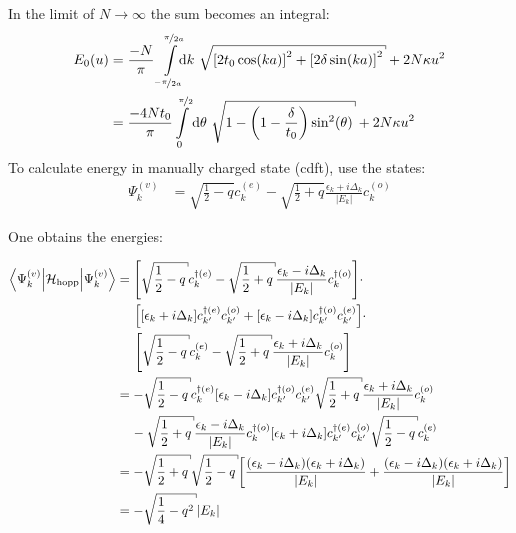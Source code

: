 In the limit of $N \rightarrow \infty$ the sum becomes an integral:
\begin{align}
	E_0(u) &= \frac{-N}{\pi}\int\limits_{\nicefrac{-\pi}{2a}}^{\nicefrac{\pi}{2a}}\hspace*{-0.2cm}\text{d}k\ \sqrt{\left[2t_0\cos(ka)\right]^2+\left[2\delta\sin(ka)\right]^2} + 2N\kappa u^2\\
	&=\frac{-4Nt_0}{\pi}\int\limits_{0}^{\nicefrac{\pi}{2}}\text{d}\theta\  \sqrt{1-\left(1-\frac{\delta}{t_0}\right)\sin^2(\theta)} + 2N\kappa u^2
\end{align}
To calculate energy in manually charged state (cdft), use the states:
\begin{align}
		\Psi_k^{(v)} &= \sqrt{\frac{1}{2}-q}c_k^{(e)}- \sqrt{\frac{1}{2}+q}\frac{\epsilon_k + i \Delta_k}{|E_k|}c_{k}^{(o)}
\end{align}

One obtains the energies:

\begin{align}
	\left\langle\Psi_k^{(v)}\Big|\mathcal{H}_{\text{hopp}}\Big|\Psi_k^{(v)}\right\rangle &= \left[\sqrt{\frac{1}{2}-q}c_k^{\dagger(e)}- \sqrt{\frac{1}{2}+q}\frac{\epsilon_k - i \Delta_k}{|E_k|}c_{k}^{\dagger(o)}\right]\cdot\nonumber\\
	&\hspace*{0.5cm}\left[
	\left[\epsilon_k + i\Delta_k\right]c_{k'}^{\dagger(e)}c_{k'}^{(o)} + \left[\epsilon_k-i\Delta_k \right]	c_{k'}^{\dagger(o)}c_{k'}^{(e)}
	\right]\cdot\nonumber\\
	&\hspace*{0.5cm}\left[\sqrt{\frac{1}{2}-q}c_k^{(e)}- \sqrt{\frac{1}{2}+q}\frac{\epsilon_k + i \Delta_k}{|E_k|}c_{k}^{(o)}\right]\\
	&=-\sqrt{\frac{1}{2}-q}c_k^{\dagger(e)}\left[\epsilon_k-i\Delta_k \right]	c_{k'}^{\dagger(o)}c_{k'}^{(e)}\sqrt{\frac{1}{2}+q}\frac{\epsilon_k + i \Delta_k}{|E_k|}c_{k}^{(o)}\nonumber\\
	&\hspace*{0.4cm}-\sqrt{\frac{1}{2}+q}\frac{\epsilon_k - i \Delta_k}{|E_k|}c_{k}^{\dagger(o)}\left[\epsilon_k + i\Delta_k\right]c_{k'}^{\dagger(e)}c_{k'}^{(o)}\sqrt{\frac{1}{2}-q}c_k^{(e)}\\
	&=-\sqrt{\frac{1}{2}+q}\sqrt{\frac{1}{2}-q}\left[\frac{(\epsilon_k-i\Delta_k)(\epsilon_k+i\Delta_k)}{|E_k|}+\frac{(\epsilon_k-i\Delta_k)(\epsilon_k+i\Delta_k)}{|E_k|}\right]\\
	&= - \sqrt{\frac{1}{4}-q^2} |E_k|
\end{align}

